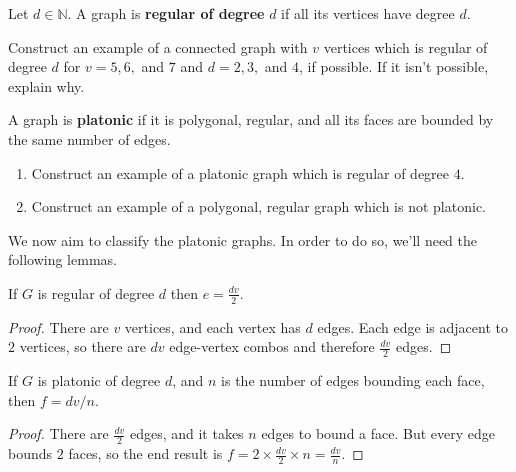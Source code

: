 \begin{definition} Let $d\in \mathbb{N}$.  A graph is \textbf{regular of degree} $d$ if all its vertices have degree $d$.
\end{definition}

\begin{examples} Construct an example of a connected graph with $v$ vertices which is regular of degree $d$ for $v = 5, 6,$ and $7$ and $d=2, 3,$ and $4$, if possible.  If it isn't possible, explain why.
\end{examples}

\begin{definition} A graph is \textbf{platonic} if it is polygonal, regular, and all its faces are bounded by the same number of edges.
\end{definition}

\begin{examples}\leavevmode
\begin{enumerate}
    \item Construct an example of a platonic graph which is regular of degree $4$.
    \item Construct an example of a polygonal, regular graph which is not platonic.
\end{enumerate}
\end{examples}

\noindent We now aim to classify the platonic graphs.  In order to do so, we'll need the following lemmas.

\begin{lemma} If $G$ is regular of degree $d$ then $e=\frac{dv}{2}$.
\end{lemma}
\begin{proof}
  There are $v$ vertices, and each vertex has $d$ edges. Each edge is adjacent to $2$ vertices, so there are $dv$ edge-vertex combos and therefore $\frac{dv}{2}$ edges.
\end{proof}

\begin{lemma} If $G$ is platonic of degree $d$, and $n$ is the number of edges bounding each face, then $f = dv/n$.
\end{lemma}
\begin{proof}
  There are $\frac{dv}{2}$ edges, and it takes $n$ edges to bound a face. But every edge bounds $2$ faces, so the end result is $f = 2 \times \frac{dv}{2} \times n = \frac{dv}{n}$.
\end{proof}

